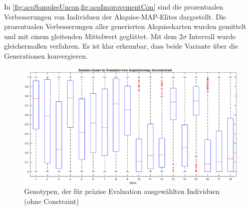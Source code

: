 In \cref{fig:acqSamplesUncon,fig:acqImprovementCon} sind die prozentualen Verbesserungen von Individuen der Akquise-MAP-Elites dargestellt.
Die prozentualen Verbesserungen aller generierten Akquisekarten wurden gemittelt und mit einem gleitenden Mittelwert geglättet.
Mit dem $2\sigma$ Intervall wurde gleichermaßen verfahren.
Es ist klar erkennbar, dass beide Variante über die Generationen konvergieren.

\begin{figure}[h]
	\centering
	\includegraphics[width=1\linewidth]{bilder/6pt1000Samples/acquisitionDiversityUncon}
	\caption{Genotypen, der für präzise Evaluation ausgewählten Individuen (ohne Constraint)}
	\label{fig:geneticDivUncon}
\end{figure}

